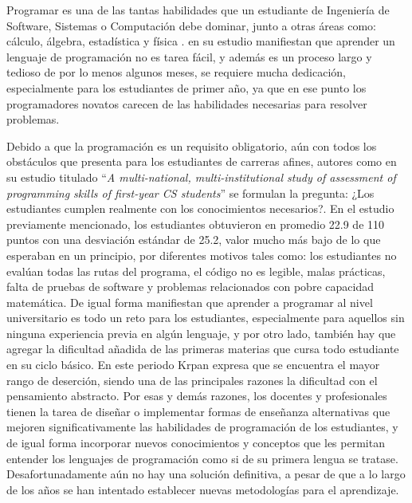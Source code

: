 Programar es una de las tantas habilidades que un estudiante de Ingeniería de Software, Sistemas o Computación debe dominar, junto a otras áreas como: cálculo, álgebra, estadística y física \parencite{Ozmen2014}. \textcite{Tan2009} en su estudio manifiestan que aprender un lenguaje de programación no es tarea fácil, y además es un proceso largo y tedioso de por lo menos algunos meses, se requiere mucha dedicación, especialmente para los estudiantes de primer año, ya que en ese punto los programadores novatos carecen de las habilidades necesarias para resolver problemas.

Debido a que la programación es un requisito obligatorio, aún con todos los obstáculos que presenta para los estudiantes de carreras afines, autores como \textcite{McCracken2001} en su estudio titulado ``\textit{A multi-national, multi-institutional study of assessment of programming skills of first-year CS students}'' se formulan la pregunta: ¿Los estudiantes cumplen realmente con los conocimientos necesarios?. En el estudio previamente mencionado, los estudiantes obtuvieron en promedio 22.9 de 110 puntos con una desviación estándar de 25.2, valor mucho más bajo de lo que esperaban en un principio, por diferentes motivos tales como: los estudiantes no evalúan todas las rutas del programa, el código no es legible, malas prácticas, falta de pruebas de software y problemas relacionados con pobre capacidad matemática. De igual forma \textcite{Krpan2015} manifiestan que aprender a programar al nivel universitario es todo un reto para los estudiantes, especialmente para aquellos sin ninguna experiencia previa en algún lenguaje, y por otro lado, también hay que agregar la dificultad añadida de las primeras materias que cursa todo estudiante en su ciclo básico. En este periodo Krpan expresa que se encuentra el mayor rango de deserción, siendo una de las principales razones la dificultad con el pensamiento abstracto. Por esas y demás razones, los docentes y profesionales tienen la tarea de diseñar o implementar formas de enseñanza alternativas que mejoren significativamente las habilidades de programación de los estudiantes, y de igual forma incorporar nuevos conocimientos y conceptos que les permitan entender los lenguajes de programación como si de su primera lengua se tratase. Desafortunadamente aún no hay una solución definitiva, a pesar de que a lo largo de los años se han intentado establecer nuevas metodologías para el aprendizaje.

